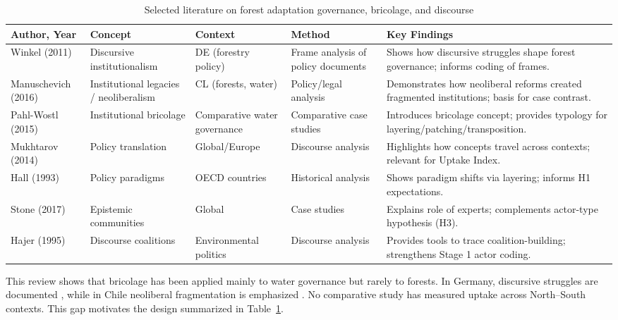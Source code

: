 \begin{table}[h!]
\centering
\tiny
\caption{Selected literature on forest adaptation governance, bricolage, and discourse}
\label{tab:litreview}
\begin{tabular}{@{}p{2cm}p{2cm}p{3cm}p{4cm}p{4.5cm}@{}}
\toprule
\textbf{Author, Year} & \textbf{Concept} & \textbf{Context} & \textbf{Method} & \textbf{Key Findings} \\ \midrule
Winkel (2011) & Discursive institutionalism & DE (forestry policy) & Frame analysis of policy documents & Shows how discursive struggles shape forest governance; informs coding of frames. \\
Manuschevich (2016) & Institutional legacies / neoliberalism & CL (forests, water) & Policy/legal analysis & Demonstrates how neoliberal reforms created fragmented institutions; basis for case contrast. \\
Pahl-Wostl (2015) & Institutional bricolage & Comparative water governance & Comparative case studies & Introduces bricolage concept; provides typology for layering/patching/transposition. \\
Mukhtarov (2014) & Policy translation & Global/Europe & Discourse analysis & Highlights how concepts travel across contexts; relevant for Uptake Index. \\
Hall (1993) & Policy paradigms & OECD countries & Historical analysis & Shows paradigm shifts via layering; informs H1 expectations. \\
Stone (2017) & Epistemic communities & Global & Case studies & Explains role of experts; complements actor-type hypothesis (H3). \\
Hajer (1995) & Discourse coalitions & Environmental politics & Discourse analysis & Provides tools to trace coalition-building; strengthens Stage 1 actor coding. \\
\bottomrule
\end{tabular}
\end{table}


This review shows that bricolage has been applied mainly to water governance 
\parencite{PahlWostl2015} but rarely to forests. In Germany, discursive struggles 
are documented \cite{Winkel2011}, while in Chile neoliberal fragmentation is 
emphasized \cite{Manuschevich2016}. No comparative study has measured uptake 
across North–South contexts. This gap motivates the design summarized in 
Table~\ref{tab:litreview}.

